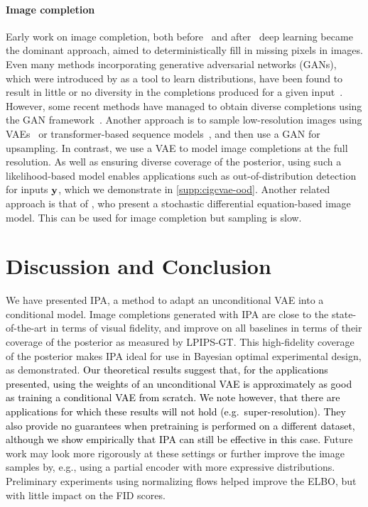 \paragraph{Image completion}
Early work on image completion, both
before~\citep{bertalmio2000image,bertalmio2001navier,ballester2001filling,levin2003learning,criminisi2003object}
and after~\citep{kohler2014mask,ren2015shepard} deep learning became the
dominant approach, aimed to deterministically fill in missing pixels in images.
Even many methods incorporating generative adversarial networks (GANs), which
were introduced by \citet{goodfellow2014generative} as a tool to learn
distributions, have been found to result in little or no diversity in the
completions produced for a given
input~\citep{song2018spg,yu2018generative,yu2019free,pathak2016context,iizuka2017globally}.
%
However, some recent methods have managed to obtain diverse completions using
the GAN framework~\citep{zhao2020uctgan,zhao2021large,liu2021pd}.
%
Another approach is to sample low-resolution images using
VAEs~\citep{zheng2019pluralistic,peng2021generating} or transformer-based
sequence models~\citep{zheng2021tfill,wan2021high}, and then use a GAN for
upsampling. In contrast, we use a VAE to model image completions at the full
resolution. As well as ensuring diverse coverage of the posterior, using such a
likelihood-based model enables applications such as out-of-distribution
detection for inputs $\mathbf{y}{}$, which we demonstrate in \cref{supp:cigcvae-ood}.
Another related approach is that of \citet{song2020score}, who present a
stochastic differential equation-based image model. This can be used for image
completion but sampling is slow.

\section{Discussion and Conclusion}

We have presented IPA, a method to adapt an unconditional VAE into a conditional
model. Image completions generated with IPA are close to the state-of-the-art in
terms of visual fidelity, and improve on all baselines in terms of their
coverage of the posterior as measured by LPIPS-GT. This high-fidelity coverage
of the posterior makes IPA ideal for use in Bayesian optimal experimental
design, as demonstrated.
%
% 
\textcolor{black}{ Our theoretical results suggest that, for the applications
  presented, using the weights of an unconditional VAE is approximately as good
  as training a conditional VAE from scratch. We note however, that there are
  applications for which these results will not hold (e.g.~super-resolution).
  They also provide no guarantees when pretraining is performed on a different
  dataset, although we show empirically that IPA can still be effective in this
  case. }
% 
Future work may look more rigorously at these settings or further improve the
image samples by, e.g., using a partial encoder with more expressive
distributions.
%
Preliminary experiments using normalizing flows helped improve the ELBO, but
with little impact on the FID scores.